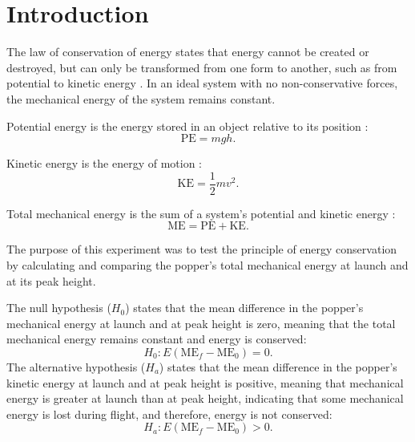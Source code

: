 \documentclass[reprint,amsmath,amssymb,aps,twoside]{revtex4-2} %
\begin{document}






\section{Introduction}
The law of conservation of energy states that energy cannot be created or destroyed, but can only be transformed from one form to another, such as from potential to kinetic energy \cite{clausius:1851:on,tipler,barrons,openstax}. In an ideal system with no non-conservative forces, the mechanical energy of the system remains constant.

Potential energy is the energy stored in an object relative to its position \cite{tipler,barrons,openstax}:
\begin{equation}
\text{PE} = mgh.
\end{equation}

Kinetic energy is the energy of motion \cite{tipler,barrons,openstax}:
\begin{equation}
\text{KE} = \frac{1}{2} m v^2.
\end{equation}

Total mechanical energy is the sum of a system’s potential and kinetic energy \cite{tipler,barrons,openstax}:
\begin{equation}
\text{ME} = \text{PE} + \text{KE}.
\end{equation}

The purpose of this experiment was to test the principle of energy conservation by calculating and comparing the popper’s total mechanical energy at launch and at its peak height.

The null hypothesis ($H_0$) states that the mean difference in the popper’s mechanical energy at launch and at peak height is zero, meaning that the total mechanical energy remains constant and energy is conserved:
\begin{equation}
H_0: E(\text{ME}_f - \text{ME}_0) = 0.
\end{equation}
The alternative hypothesis ($H_a$) states that the mean difference in the popper’s kinetic energy at launch and at peak height is positive, meaning that mechanical energy is greater at launch than at peak height, indicating that some mechanical energy is lost during flight, and therefore, energy is not conserved:
\begin{equation}
H_a: E(\text{ME}_f - \text{ME}_0) > 0.
\end{equation}
    
\end{document}
